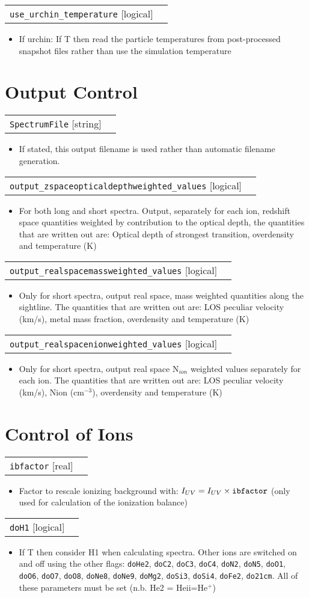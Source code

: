 \documentclass{report}
\makeatletter
\newcommand{\paramdefinition}[3]{
\begin{tabular*}{\textwidth}{l@{\extracolsep{\fill}}r}
		{\tt #1} [{\sc #2}]& #3 \\
\end{tabular*}}
\newcommand{\paramdescription}[1]{
\begin{itemize}
\item #1
\end{itemize}\vspace{0.2cm}}
\makeatother
\begin{document}
\paramdefinition{use\_urchin\_temperature}{logical}{}
\paramdescription{If urchin: If T then read the particle temperatures from post-processed snapshot files rather than use the simulation temperature}

\section{Output Control}

\paramdefinition{SpectrumFile}{string}{}
\paramdescription{If stated, this output filename is used rather than automatic filename generation.}

\paramdefinition{output\_zspaceopticaldepthweighted\_values}{logical}{ }
\paramdescription{For both long and short spectra. Output, separately for each ion, redshift space quantities weighted by contribution to the optical depth, the quantities that are written out are:  Optical depth of strongest transition, overdensity and temperature (K)}

\paramdefinition{output\_realspacemassweighted\_values}{logical}{ }
\paramdescription{Only for short spectra, output real space, mass weighted quantities along the sightline.  The quantities that are written out are: LOS peculiar velocity (km/s), metal mass fraction, overdensity and temperature (K)}

\paramdefinition{output\_realspacenionweighted\_values}{logical}{ }
\paramdescription{Only for short spectra, output real space N$_{ion}$ weighted values separately for each ion.  The quantities that are written out are: LOS peculiar velocity (km/s), Nion (cm$^{-3}$), overdensity and temperature (K)}

\section{Control of Ions}

\paramdefinition{ibfactor}{real}{}
\paramdescription{Factor to rescale ionizing background with: $I_{UV} = I_{UV}\times{\tt ibfactor}$ (only used for calculation of the ionization balance)}

\paramdefinition{doH1}{logical}{}
\paramdescription{If T then consider H1 when calculating spectra.  Other ions are switched on and off using the other flags: {\tt doHe2}, {\tt doC2}, {\tt doC3}, {\tt doC4}, {\tt doN2}, {\tt doN5}, {\tt doO1}, {\tt doO6}, {\tt doO7}, {\tt doO8}, {\tt doNe8}, {\tt doNe9}, {\tt doMg2}, {\tt doSi3}, {\tt doSi4}, {\tt doFe2}, {\tt do21cm}.  All of these parameters must be set (n.b. He2 = He{\sc ii}=He$^+$)}
\end{document}
